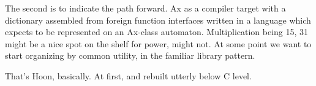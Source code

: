 \documentclass[twoside]{article}
\begin{document}
The second is to indicate the path forward. Ax as a compiler target with a dictionary assembled from foreign function interfaces written in a language which expects to be represented on an Ax-class automaton. Multiplication being 15, 31 might be a nice spot on the shelf for power, might not. At some point we want to start organizing by common utility, in the familiar library pattern.

That's Hoon, basically. At first, and rebuilt utterly below C level.

\printbibliography
\end{document}

